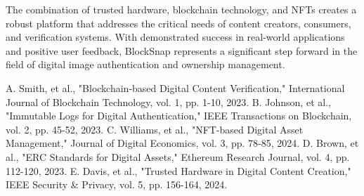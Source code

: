 \documentclass[conference]{IEEEtran}
\begin{document}
The combination of trusted hardware, blockchain technology, and NFTs creates a robust platform that addresses the critical needs of content creators, consumers, and verification systems. With demonstrated success in real-world applications and positive user feedback, BlockSnap represents a significant step forward in the field of digital image authentication and ownership management.

\begin{thebibliography}{00}
 A. Smith, et al., "Blockchain-based Digital Content Verification," International Journal of Blockchain Technology, vol. 1, pp. 1-10, 2023.
 B. Johnson, et al., "Immutable Logs for Digital Authentication," IEEE Transactions on Blockchain, vol. 2, pp. 45-52, 2023.
 C. Williams, et al., "NFT-based Digital Asset Management," Journal of Digital Economics, vol. 3, pp. 78-85, 2024.
 D. Brown, et al., "ERC Standards for Digital Assets," Ethereum Research Journal, vol. 4, pp. 112-120, 2023.
 E. Davis, et al., "Trusted Hardware in Digital Content Creation," IEEE Security & Privacy, vol. 5, pp. 156-164, 2024.
\end{thebibliography}
\end{document}
